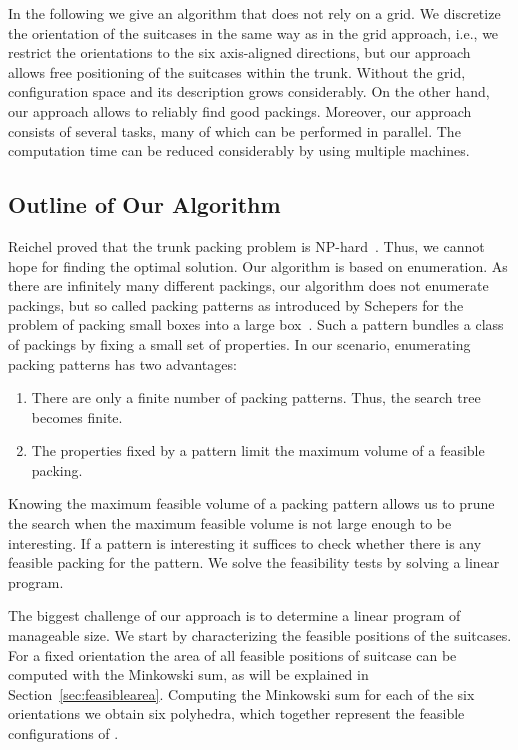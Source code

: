\documentclass{article}
\newcounter{algo}
\begin{document}
In the following we give an algorithm that does not rely on a grid.
We discretize the orientation of the suitcases in the same way as in
the grid approach, i.e., we restrict the orientations to the six
axis-aligned directions, but our approach allows free positioning of
the suitcases within the trunk. Without the grid, configuration space
and its description grows considerably. On the other hand, our
approach allows to reliably find good packings. Moreover, our approach
consists of several tasks, many of which can be performed in
parallel. The computation time can be reduced considerably by using
multiple machines.

\subsection{Outline of Our Algorithm}
\label{sec:algorithm}

Reichel proved that the trunk packing problem is
NP-hard~\cite{Reichel06}. Thus, we cannot hope for finding the optimal
solution. Our algorithm is based on enumeration. As there are
infinitely many different packings, our algorithm does not enumerate
packings, but so called packing patterns as introduced by Schepers for
the problem of packing small boxes into a large
box~\cite{schepers}. Such a pattern bundles a class of packings by
fixing a small set of properties. In our scenario, enumerating packing
patterns has two advantages:
\begin{enumerate}
\item There are only a finite number of packing patterns. Thus, the
search tree becomes finite.
\item The properties fixed by a pattern limit the maximum volume of a feasible packing.
\end{enumerate}
\noindent Knowing the maximum feasible volume of a packing pattern
allows us to prune the search when the maximum feasible volume is not
large enough to be interesting. If a pattern is interesting it
suffices to check whether there is any feasible packing for the
pattern. We solve the feasibility tests by solving a linear program.

The biggest challenge of our approach is to determine a linear program
of manageable size. We start by characterizing the feasible positions
of the suitcases. For a fixed orientation the area of all feasible
positions of suitcase  can be computed with the Minkowski sum, as
will be explained in Section~\ref{sec:feasiblearea}. Computing the
Minkowski sum for each of the six orientations we obtain six
polyhedra, which together represent the feasible configurations of
.
\end{document}
